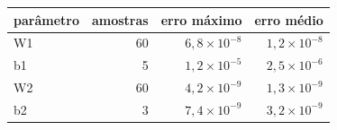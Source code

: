 
\begin{tabular}{lrrr}
\toprule
\textbf{parâmetro} & \textbf{amostras} & \textbf{erro máximo} & \textbf{erro médio} \\
\midrule
W1 & 60 & $6{,}8\times10^{-8}$ & $1{,}2\times10^{-8}$ \\
b1 & 5 & $1{,}2\times10^{-5}$ & $2{,}5\times10^{-6}$ \\
W2 & 60 & $4{,}2\times10^{-9}$ & $1{,}3\times10^{-9}$ \\
b2 & 3 & $7{,}4\times10^{-9}$ & $3{,}2\times10^{-9}$ \\
\bottomrule
\end{tabular}
